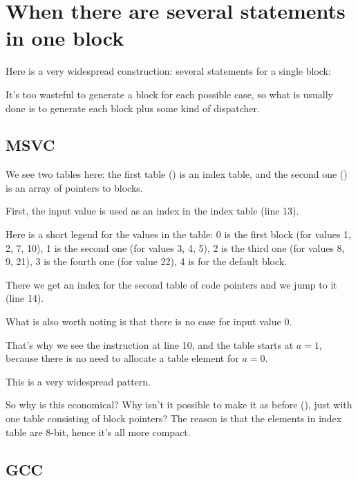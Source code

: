 \section{When there are several  statements in one block}

Here is a very widespread construction: several  statements for a single block:



It's too wasteful to generate a block for each possible case,
so what is usually done is to generate each block plus some kind of dispatcher.

\subsection{MSVC}



We see two tables here: the first table () is an index table, and the second one () is an array of pointers to blocks.

First, the input value is used as an index in the index table (line 13). 

Here is a short legend for the values in the table: 
0 is the first  block (for values 1, 2, 7, 10),
1 is the second one (for values 3, 4, 5),
2 is the third one (for values 8, 9, 21),
3 is the fourth one (for value 22),
4 is for the default block.

There we get an index for the second table of code pointers and we jump to it (line 14).

What is also worth noting is that there is no case for input value 0.

That's why we see the \DEC instruction at line 10, and the table starts at $a=1$, 
because there is no need to allocate a table element for $a=0$.

This is a very widespread pattern.

So why is this economical?
Why isn't it possible to make it as before
(), just with one table consisting of block pointers?
The reason is that the elements in index table are 8-bit, hence it's all more compact.

\subsection{GCC}


